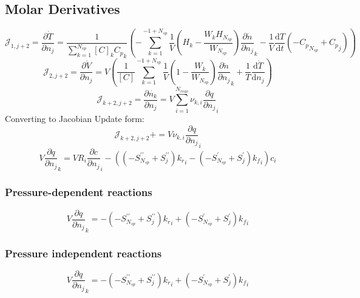 \documentclass[a4paper,10pt]{article}
\newcommand{\pluseq}{\mathrel{{+}{=}}}
\newcommand{\ns}{N_{sp}}
\newcommand{\nr}{N_{reac}}
\begin{document}
\subsection{Molar Derivatives}
\begin{dmath} \mathcal{J}_{1,j + 2} = \frac{\partial\dot{T}}{\partial{n_j}} = \frac{1}{\sum_{k=1}^{\ns} [C]_{k} {C_p}_{k}} \left(- \sum_{k=1}^{-1 + \ns} \frac{1}{V} \left(H_{k} - \frac{W_{k} H_{\ns}}{W_{\ns}}\right) \frac{\partial \dot{n} }{\partial {n_j} }_{k} - \frac{1}{V} \frac{\text{d} T }{\text{d} t } \left(- {C_p}_{\ns} + {C_p}_{j}\right)\right)\end{dmath} 
\begin{dmath} \mathcal{J}_{2,j + 2} = \frac{\partial \dot{ V } }{\partial {n_j} } = V \left(\frac{1}{[C]} \sum_{k=1}^{-1 + \ns} \frac{1}{V} \left(1 - \frac{W_{k}}{W_{\ns}}\right) \frac{\partial \dot{n} }{\partial {n_j} }_{k} + \frac{1}{T} \frac{\text{d} \dot{T} }{\text{d} {n_j} }\right)\end{dmath} 
\begin{dmath} \mathcal{J}_{k + 2,j + 2} = \frac{\partial \dot{n_k} }{\partial n_{j} } = V \sum_{i=1}^{\nr} \nu_{k,i} \frac{\partial q }{\partial {n_j} }_{i}\end{dmath} 
Converting to Jacobian Update form:
\begin{dmath} \mathcal{J}_{k + 2,j + 2}\pluseq V \nu_{k,i} \frac{\partial q }{\partial {n_j} }_{i}\end{dmath} 
\begin{dmath} V \frac{\partial q }{\partial {n_j} }_{k} = V R_{i} \frac{\partial c }{\partial {n_j} }_{i} - \left(\left(- S^{\prime\prime}_{\ns} + S^{\prime\prime}_{j}\right) {k_r}_{i} - \left(- S^{\prime}_{\ns} + S^{\prime}_{j}\right) {k_f}_{i}\right) c_{i}\end{dmath} 
\subsubsection{Pressure-dependent reactions}
\begin{dmath} V \frac{\partial q }{\partial {n_j} }_{k} = - \left(- S^{\prime\prime}_{\ns} + S^{\prime\prime}_{j}\right) {k_r}_{i} + \left(- S^{\prime}_{\ns} + S^{\prime}_{j}\right) {k_f}_{i}\end{dmath} 
\subsubsection{Pressure independent reactions}
\begin{dmath} V \frac{\partial q }{\partial {n_j} }_{k} = - \left(- S^{\prime\prime}_{\ns} + S^{\prime\prime}_{j}\right) {k_r}_{i} + \left(- S^{\prime}_{\ns} + S^{\prime}_{j}\right) {k_f}_{i}\end{dmath} 
\end{document}
